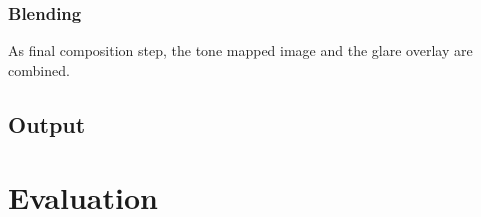 \subsubsection{Blending}
As final composition step, the tone mapped image and the glare overlay are combined.


\subsection{Output}

\section{Evaluation} %

